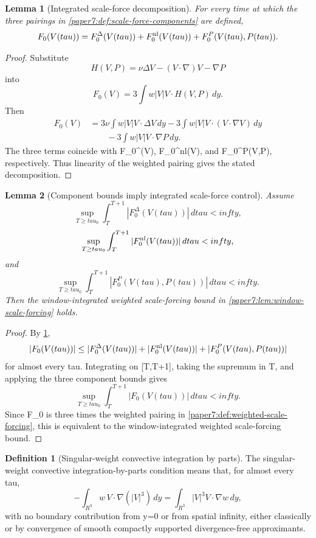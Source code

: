 \documentclass[11pt]{amsart}
\def\({}%
\def\){}%
\def\mathbb#1{#1}%
\def\tau{tau}%
\def\infty{infty}%
\theoremstyle{plain}
\newtheorem{lemma}[lemma]{Lemma}
\theoremstyle{definition}
\newtheorem{definition}[definition]{Definition}
\theoremstyle{remark}
\begin{document}
\begin{lemma}[Integrated scale-force decomposition]
\label{paper7:lem:scale-force-decomposition-window}
For every time at which the three pairings in
\cref{paper7:def:scale-force-components} are defined,
\[
  F_0(V(\tau))
  =
  F_0^\Delta(V(\tau))
  +F_0^{\rm nl}(V(\tau))
  +F_0^P(V(\tau),P(\tau)).
\]
\end{lemma}

\begin{proof}
Substitute
\[
  H(V,P)=\nu\Delta V-(V\cdot\nabla)V-\nabla P
\]
into
\[
  F_0(V)=3\int w|V|V\cdot H(V,P)\,dy.
\]
Then
\[
\begin{aligned}
  F_0(V)
  &=
  3\nu\int w|V|V\cdot\Delta V\,dy
  -3\int w|V|V\cdot(V\cdot\nabla V)\,dy  \\
  &\qquad
  -3\int w|V|V\cdot\nabla P\,dy .
\end{aligned}
\]
The three terms coincide with \(F_0^\Delta(V)\), \(F_0^{\rm nl}(V)\), and
\(F_0^P(V,P)\), respectively.  Thus linearity of the weighted pairing gives
the stated decomposition.
\end{proof}

\begin{lemma}[Component bounds imply integrated scale-force control]
\label{paper7:lem:scale-components-control}
Assume
\[
  \sup_{T\ge\tau_0}
  \int_T^{T+1}|F_0^\Delta(V(\tau))|\,d\tau<\infty,
\]
\[
  \sup_{T\ge\tau_0}
  \int_T^{T+1}|F_0^{\rm nl}(V(\tau))|\,d\tau<\infty,
\]
and
\[
  \sup_{T\ge\tau_0}
  \int_T^{T+1}|F_0^P(V(\tau),P(\tau))|\,d\tau<\infty.
\]
Then the window-integrated weighted scale-forcing bound in
\cref{paper7:lem:window-scale-forcing} holds.
\end{lemma}

\begin{proof}
By \cref{paper7:lem:scale-force-decomposition-window},
\[
  |F_0(V(\tau))|
  \le
  |F_0^\Delta(V(\tau))|
  +|F_0^{\rm nl}(V(\tau))|
  +|F_0^P(V(\tau),P(\tau))|
\]
for almost every \(\tau\).  Integrating on \([T,T+1]\), taking the supremum
in \(T\), and applying the three component bounds gives
\[
  \sup_{T\ge\tau_0}\int_T^{T+1}|F_0(V(\tau))|\,d\tau<\infty.
\]
Since \(F_0\) is three times the weighted pairing in
\cref{paper7:def:weighted-scale-forcing}, this is equivalent to the
window-integrated weighted scale-forcing bound.
\end{proof}

\begin{definition}[Singular-weight convective integration by parts]
\label{paper7:def:singular-weight-convective-ibp}
The singular-weight convective integration-by-parts condition means that, for
almost every \(\tau\),
\[
  -\int_{\mathbb R^3}w\,V\cdot\nabla(|V|^3)\,dy
  =
  \int_{\mathbb R^3}|V|^3V\cdot\nabla w\,dy,
\]
with no boundary contribution from \(y=0\) or from spatial infinity, either
classically or by convergence of smooth compactly supported divergence-free
approximants.
\end{definition}
\end{document}
